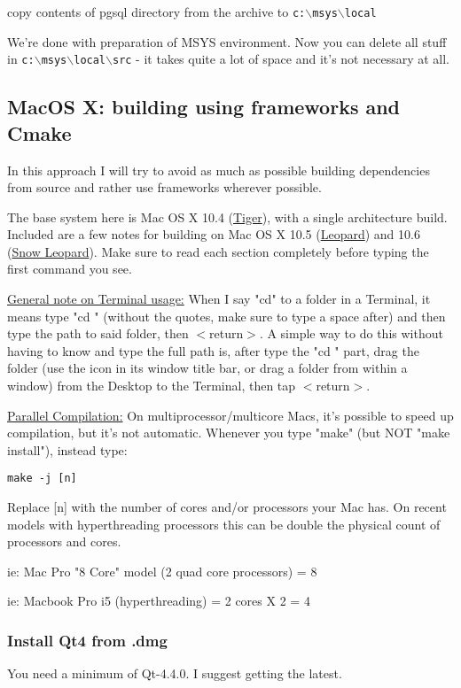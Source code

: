 copy contents of pgsql directory from the archive to \texttt{c:$\backslash$msys$\backslash$local}

We're done with preparation of MSYS environment. Now you can delete all stuff in \texttt{c:$\backslash$msys$\backslash$local$\backslash$src} - it takes quite a lot
of space and it's not necessary at all.


\hypertarget{toc18}{}
\subsection{MacOS X: building using frameworks and Cmake}
In this approach I will try to avoid as much as possible building dependencies
from source and rather use frameworks wherever possible.

The base system here is Mac OS X 10.4 (\underline{Tiger}), with a single architecture build.
Included are a few notes for building on Mac OS X 10.5 (\underline{Leopard}) and 10.6 (\underline{Snow Leopard}).
Make sure to read each section completely before typing the first command you see.

\underline{General note on Terminal usage:}  When I say "cd" to a folder in a Terminal,
it means type "cd " (without the quotes, make sure to type a space after) and
then type the path to said folder, then $<$return$>$.  A simple way to do this without having to know
and type the full path is, after type the "cd " part, drag the folder (use the icon
in its window title bar, or drag a folder from within a window) from the Desktop
to the Terminal, then tap $<$return$>$.

\underline{Parallel Compilation:} On multiprocessor/multicore Macs, it's possible to speed
up compilation, but it's not automatic.  Whenever you type "make" (but NOT "make install"),
instead type:

\begin{verbatim}
make -j [n]
\end{verbatim}

Replace [n] with the number of cores and/or processors your Mac has.  On recent
models with hyperthreading processors this can be double the physical count of
processors and cores.

ie: Mac Pro "8 Core" model (2 quad core processors) = 8

ie: Macbook Pro i5 (hyperthreading) = 2 cores X 2 = 4

\hypertarget{toc19}{}
\subsubsection{Install Qt4 from .dmg}
You need a minimum of Qt-4.4.0. I suggest getting the latest.

